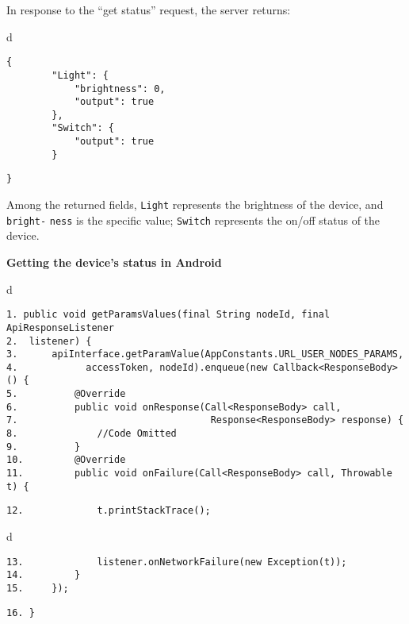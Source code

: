 \documentclass[a4paper,12pt]{book}
\begin{document}
In response to the “get status” request, the server returns:

\begin{codebloc}
\begin{tabular}{d}
\vspace{2pt}
\begin{verbatim}
{
        "Light": {
            "brightness": 0,
            "output": true
        },
        "Switch": {
            "output": true
        }
\end{verbatim}
\verb|}|
\end{tabular}
\end{codebloc}

Among the returned fields, \verb|Light| represents the brightness of the device, and \verb|bright-| \verb|ness| is the specific value; \verb|Switch| represents the on/off status of the device.

\textbf{Getting the device’s status in Android}


\begin{codebloc}
\begin{tabular}{d}
\vspace{2pt}
\begin{verbatim}
1. public void getParamsValues(final String nodeId, final ApiResponseListener
2.  listener) {
3.      apiInterface.getParamValue(AppConstants.URL_USER_NODES_PARAMS,
4.            accessToken, nodeId).enqueue(new Callback<ResponseBody>() {
5.          @Override
6.          public void onResponse(Call<ResponseBody> call,
7.                                  Response<ResponseBody> response) {
8.              //Code Omitted
9.          }
10.         @Override
11.         public void onFailure(Call<ResponseBody> call, Throwable t) {
\end{verbatim}
\verb|12.             t.printStackTrace();|
\end{tabular}
\end{codebloc}

\begin{codebloc}
\begin{tabular}{d}
\vspace{2pt}
\begin{verbatim}
13.             listener.onNetworkFailure(new Exception(t));
14.         }
15.     });
\end{verbatim}
\verb|16. }|
\end{tabular}
\end{codebloc}
\end{document}
